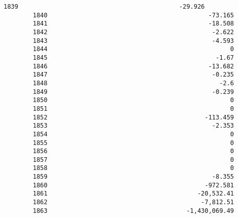 \documentclass[11pt]{article}
\begin{document}
\begin{Verbatim}[commandchars=\\\{\}]
        1839                                            -29.926      
        1840                                            -73.165      
        1841                                            -18.508      
        1842                                             -2.622      
        1843                                             -4.593      
        1844                                                  0      
        1845                                              -1.67      
        1846                                            -13.682      
        1847                                             -0.235      
        1848                                               -2.6      
        1849                                             -0.239      
        1850                                                  0      
        1851                                                  0      
        1852                                           -113.459      
        1853                                             -2.353      
        1854                                                  0      
        1855                                                  0      
        1856                                                  0      
        1857                                                  0      
        1858                                                  0      
        1859                                             -8.355      
        1860                                           -972.581      
        1861                                         -20,532.41      
        1862                                          -7,812.51      
        1863                                      -1,430,069.49      
        

\end{Verbatim}
\end{document}
